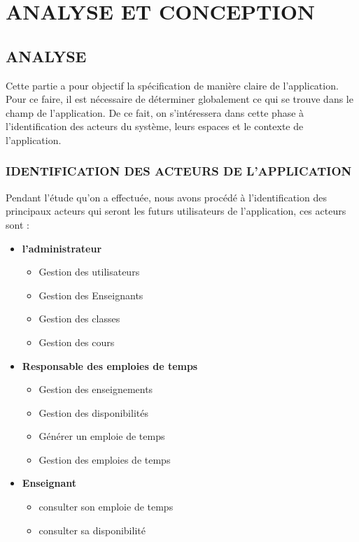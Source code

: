 \documentclass[english,12pt,a4paper]{report}
\begin{document}
\chapter{ANALYSE ET CONCEPTION}
\section{ANALYSE}
Cette partie a pour objectif la spécification de manière claire de l’application. Pour ce faire, il est nécessaire de déterminer globalement ce qui se trouve dans le champ de l’application. De ce fait, on s’intéressera dans cette phase à l’identification des acteurs du système, leurs espaces et le contexte de l’application.
\subsection{IDENTIFICATION DES ACTEURS DE L'APPLICATION}
Pendant l’étude qu’on a effectuée, nous avons procédé à l’identification des
principaux acteurs qui seront les futurs utilisateurs de l’application, ces acteurs
sont :
\begin{itemize}
	\item \textbf{l'administrateur}
	\begin{itemize}
		\item Gestion des utilisateurs
		\item Gestion des Enseignants
		\item Gestion des classes
		\item Gestion des cours
	\end{itemize}
	\item \textbf{Responsable des emploies de temps}
	\begin{itemize}
		\item Gestion des enseignements
		\item Gestion des disponibilités
		\item  Générer un emploie de temps
		\item Gestion des emploies de temps
	\end{itemize}
	\item \textbf{Enseignant}
	\begin{itemize}
		\item consulter son emploie de temps
		\item consulter sa disponibilité
	\end{itemize}
\end{itemize}
\end{document}
